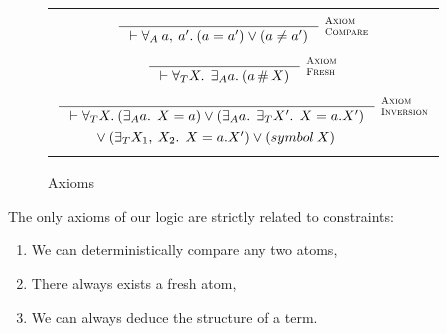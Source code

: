 \documentclass[english, mgr]{iithesis}
\newcommand{\scbrk}[2]{\myatop{\textsc{#1}}{\textsc{#2}}}
\begin{document}
\begin{figure}[htpb]
  \centering
  \begin{tabularx}{\textwidth}{|C|}
  \hline
  \\ $
  \inference{
  }{
    \jgmnt[]{\fForallAtom{\:\atomv,\:\atomv'} (\atomv \ceq \atomv') \vee (\atomv \cneq \atomv')}
  }\:\scbrk{Axiom}{Compare}
  $ \\ \\ $
  \inference{
  }{
    \jgmnt[]{\fForallTerm{\termv} \:\fExistsAtom{\atomv} (\atomv \cfresh \termv)}
  }\:\scbrk{Axiom}{Fresh}
  $ \\ \\ $
  \inference{
  }{
    \jgmnt[]{\fForallTerm{\termv} (\fExistsAtom{\atomv}\: \termv = \atomv) \vee (\fExistsAtom{\atomv}\:\fExistsTerm{\termv'}\: \termv = \tbind{\atomv}{\termv'}) }
  }\:\scbrk{Axiom}{Inversion} $ \\
  $\vee \: (\exists_T X_1,\:X_2 .\:\: X = a.{X'}) \vee ({symbol}\: X) \qquad\qquad$ \\
  \\
  \hline
  \end{tabularx}
  \caption{Axioms}
  \label{fig:axioms}
\end{figure}

The only axioms of our logic are strictly related to constraints:
\begin{enumerate}
\item We can deterministically compare any two atoms,
\item There always exists a fresh atom,
\item We can always deduce the structure of a term.
\end{enumerate}
\end{document}
